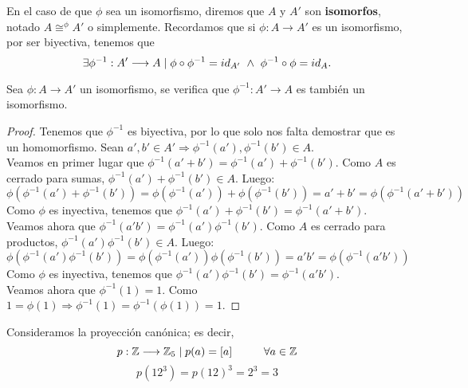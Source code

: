 En el caso de que $\phi$ sea un isomorfismo, diremos que $A$ y $A'$ son \textbf{isomorfos}, notado $\displaystyle A \mathop{\cong}^{\phi} A'$ o simplemente. Recordamos que si $\phi:A\longrightarrow A'$ es un isomorfismo, por ser biyectiva, tenemos que $$\exists \phi^{-1}:A' \longrightarrow A
    \mid \phi \circ \phi^{-1} = id_{A'} \ \land \  \phi^{-1} \circ \phi = id_A.$$
    
\begin{prop}
    Sea $\phi:A\longrightarrow A'$ un isomorfismo, se verifica que $\phi^{-1}:A'\longrightarrow A$ es también un isomorfismo.
\end{prop}
\begin{proof}
    Tenemos que $\phi^{-1}$ es biyectiva, por lo que solo nos falta demostrar que es un homomorfismo. Sean $a',b' \in A' \Longrightarrow \phi^{-1}(a'),\phi^{-1}(b') \in A$.\\

    Veamos en primer lugar que $\phi^{-1}(a'+b') = \phi^{-1}(a') + \phi^{-1}(b')$. Como $A$ es cerrado para sumas, $\phi^{-1}(a') + \phi^{-1}(b') \in A$. Luego:
    $$\phi(\phi^{-1}(a') + \phi^{-1}(b')) = \phi(\phi^{-1}(a')) + \phi(\phi^{-1}(b')) = a' + b' = \phi(\phi^{-1}(a'+b'))$$
    Como $\phi$ es inyectiva, tenemos que $\phi^{-1}(a')+\phi^{-1}(b') = \phi^{-1}(a'+b')$.\\
    
    Veamos ahora que $\phi^{-1}(a'b')=\phi^{-1}(a')\phi^{-1}(b')$. Como $A$ es cerrado para productos, $\phi^{-1}(a')\phi^{-1}(b') \in A$. Luego:
    $$\phi(\phi^{-1}(a')\phi^{-1}(b')) = \phi(\phi^{-1}(a'))\phi(\phi^{-1}(b')) = a'b' = \phi(\phi^{-1}(a'b'))$$
    Como $\phi$ es inyectiva, tenemos que $\phi^{-1}(a')\phi^{-1}(b') = \phi^{-1}(a'b')$.\\

    Veamos ahora que $\phi^{-1}(1)=1$. Como $1 = \phi(1) \Longrightarrow \phi^{-1}(1) = \phi^{-1}(\phi(1)) = 1$.
\end{proof}

\begin{ejemplo}
    Consideramos la proyección canónica; es decir,
    $$p:\mathbb Z \longrightarrow \mathbb Z_5 \mid p(a) = [a] \hspace{1cm} \forall a \in \mathbb Z$$
    $$p(12^3) = p(12)^3 = 2^3 = 3$$
\end{ejemplo}

